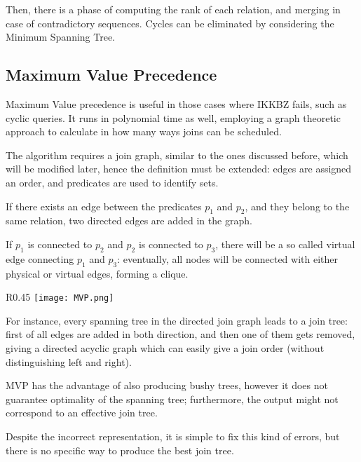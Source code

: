 Then, there is a phase of computing the rank of each relation, and merging in case of contradictory sequences. Cycles can be eliminated by considering the Minimum Spanning Tree.

\subsection{Maximum Value Precedence}
Maximum Value precedence is useful in those cases where IKKBZ fails, such as cyclic queries. It runs in polynomial time as well, employing a graph theoretic approach to calculate in how many ways joins can be scheduled.

The algorithm requires a join graph, similar to the ones discussed before, which will be modified later, hence the definition must be extended: edges are assigned an order, and predicates are used to identify sets.

If there exists an edge between the predicates $p_1$ and $p_2$, and they belong to the same relation, two directed edges are added in the graph. 

If $p_1$ is connected to $p_2$ and $p_2$ is connected to $p_3$, there will be a so called virtual edge connecting $p_1$ and $p_3$: eventually, all nodes will be connected with either physical or virtual edges, forming a clique.

\begin{wrapfigure}{R}{0.45\textwidth}
	\vspace{-27pt}
	\texttt{[image: MVP.png]}
	\vspace{-50pt}
\end{wrapfigure}

For instance, every spanning tree in the directed join graph leads to a join tree: first of all edges are added in both direction, and then one of them gets removed, giving a directed acyclic graph which can easily give a join order (without distinguishing left and right).

MVP has the advantage of also producing bushy trees, however it does not guarantee optimality of the spanning tree; furthermore, the output might not correspond to an effective join tree.

Despite the incorrect representation, it is simple to fix this kind of errors, but there is no specific way to produce the best join tree.

